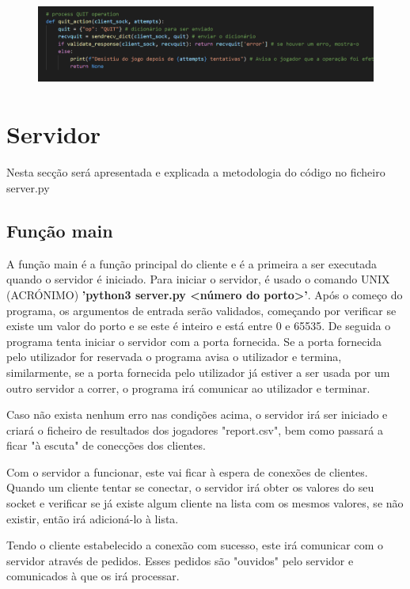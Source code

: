 \documentclass{report}
\begin{document}
\begin{figure}[!h]
\center
\includegraphics[height = 77pt]{img/quit.png}
\end{figure}
\section{Servidor}
\label{sec:server}
Nesta secção será apresentada e explicada a metodologia do código no ficheiro server.py

\subsection{Função main}
\label{ssec:func_main}

A função main é a função principal do cliente e é a primeira a ser executada quando o servidor é iniciado. Para iniciar o servidor, é usado o comando UNIX (ACRÓNIMO) \textbf{'python3 server.py <número do porto>'}. Após o começo do programa, os argumentos de entrada serão validados, começando por verificar se existe um valor do porto e se este é inteiro e está entre 0 e 65535. De seguida o programa tenta iniciar o servidor com a porta fornecida. Se a porta fornecida pelo utilizador for reservada o programa avisa o utilizador e termina, similarmente, se a porta fornecida pelo utilizador já estiver a ser usada por um outro servidor a correr, o programa irá comunicar ao utilizador e terminar. 

Caso não exista nenhum erro nas condições acima, o servidor irá ser iniciado e criará o ficheiro de resultados dos jogadores "report.csv", bem como passará a ficar "à escuta" de conecções dos clientes.

Com o servidor a funcionar, este vai ficar à espera de conexões de clientes. Quando um cliente tentar se conectar, o servidor irá obter os valores do seu socket e verificar se já existe algum cliente na lista com os mesmos valores, se não existir, então irá adicioná-lo à lista.

Tendo o cliente estabelecido a conexão com sucesso, este irá comunicar com o servidor através de pedidos. Esses pedidos são "ouvidos" pelo servidor e comunicados à  que os irá processar.
\end{document}
